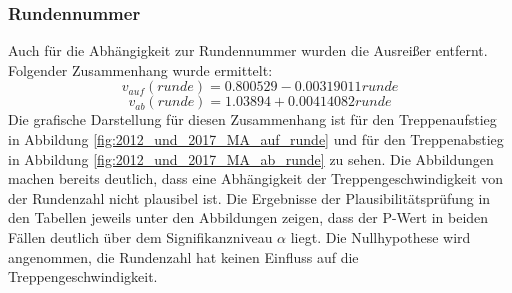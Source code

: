 \subsubsection{Rundennummer}
Auch für die Abhängigkeit zur Rundennummer wurden die Ausreißer entfernt. Folgender Zusammenhang wurde ermittelt:
\begin{equation}
v_{auf}(runde) = 0.800529 -0.00319011 runde
\label{eq:2012_2017_AufRunde_MA}
\end{equation}
\begin{equation}
v_{ab}(runde) = 1.03894 + 0.00414082 runde
\label{eq:2012_2017_AbRunde_MA}
\end{equation}
Die grafische Darstellung für diesen Zusammenhang ist für den Treppenaufstieg in Abbildung \ref{fig:2012_und_2017_MA_auf_runde} und für den Treppenabstieg in Abbildung \ref{fig:2012_und_2017_MA_ab_runde} zu sehen. Die Abbildungen machen bereits deutlich, dass eine Abhängigkeit der Treppengeschwindigkeit von der Rundenzahl nicht plausibel ist. Die Ergebnisse der Plausibilitätsprüfung in den Tabellen jeweils unter den Abbildungen zeigen, dass der P-Wert in beiden Fällen deutlich über dem Signifikanzniveau $\alpha$ liegt. Die Nullhypothese wird angenommen, die Rundenzahl hat keinen Einfluss auf die Treppengeschwindigkeit.











